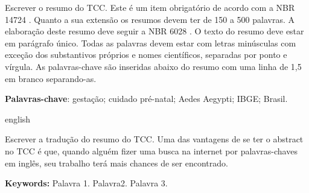 \documentclass[
        oneside,      %
        english,			
        brazil			 
        ]{configcefetmglpd}
\begin{document}
\begin{resumo_cefetmg}
	
\aplicaresumo

Escrever o resumo do TCC. Este é um item obrigatório de acordo com a NBR 14724 \cite{bib:abnt14724}. 
Quanto a sua extensão os resumos devem ter de 150 a 500 palavras. 
A elaboração deste resumo deve seguir a NBR 6028 \cite{bib:abnt6028}. 
O texto do resumo deve estar em parágrafo único. Todas as palavras devem estar com letras minúsculas com exceção dos substantivos
próprios e nomes científicos, separadas por ponto e vírgula. 
As palavras-chave são inseridas abaixo do resumo com uma linha de 1,5 em branco separando-as.

\begin{center}
\textbf{Palavras-chave}: gestação; cuidado pré-natal; Aedes Aegypti; IBGE; Brasil.
\end{center}

\end{resumo_cefetmg}
 
 
\begin{abstract_cefetmg}
 \begin{otherlanguage*}{english}

\aplicaabstract

Escrever a tradução do resumo do TCC. Uma das vantagens de se ter o abstract no TCC é que, quando alguém fizer uma busca na
internet por palavras-chaves em inglês, seu trabalho terá mais chances de ser encontrado. 

\begin{center}
\textbf{Keywords:} Palavra 1. Palavra2. Palavra 3. %
\end{center}
  \end{otherlanguage*}
\end{abstract_cefetmg}


\printatermo



\figvariadas   %
\listfigvariadas  %
\end{document}

